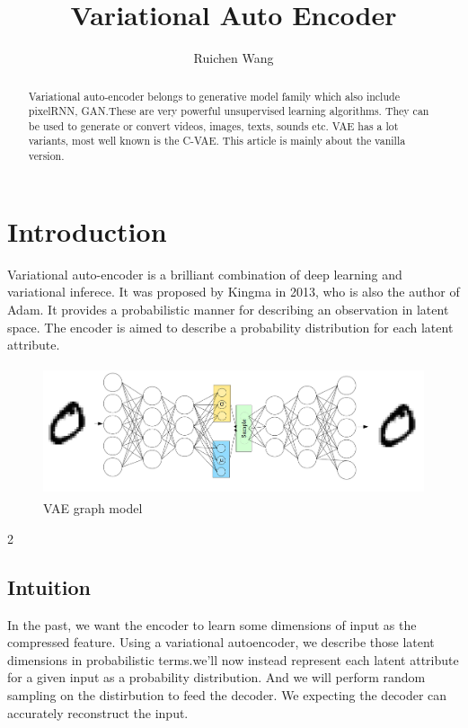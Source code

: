 \documentclass{article}
\author{Ruichen Wang}
\title{Variational Auto Encoder}
\begin{document}
\maketitle
\begin{abstract}
Variational auto-encoder \cite{DBLP:journals/corr/KingmaW13} belongs to generative model family which also include pixelRNN, GAN.These are very powerful unsupervised learning algorithms. They can be used to generate or convert videos, images, texts, sounds etc. VAE has a lot variants, most well known is the C-VAE. This article is mainly about the vanilla version.
\end{abstract}

\tableofcontents
\section{Introduction} 
Variational auto-encoder is a brilliant combination of deep learning and variational inferece. It was proposed by Kingma in 2013, who is also the author of Adam. It provides a probabilistic manner for describing an observation in latent space. The encoder is aimed to describe a probability distribution for each latent attribute.
\begin{figure}[h]
\centering
\includegraphics[width=5in,height=1.5in]{graph1}
\caption{VAE graph model}
\end{figure}2
\subsection{Intuition}
In the past, we want the encoder to learn some  dimensions of input as the compressed feature. Using a variational autoencoder, we describe those latent dimensions in probabilistic terms.we'll now instead represent each latent attribute for a given input as a probability distribution. And we will perform random sampling on the distirbution to feed the decoder. We expecting the decoder can accurately reconstruct the input.
\end{document}
